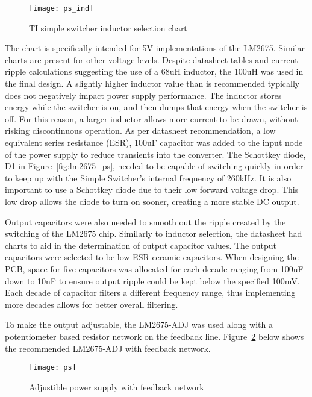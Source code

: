 \begin{figure}[H]
    \centering
    \texttt{[image: ps\_ind]}
    \caption{TI simple switcher inductor selection chart~\cite{lm2675}}
    \label{fig:inductor}
\end{figure}

The chart is specifically intended for 5V implementations of the LM2675. Similar charts are present for other voltage levels. Despite datasheet tables and current ripple calculations suggesting the use of a 68uH inductor, the 100uH was used in the final design. A slightly higher inductor value than is recommended typically does not negatively impact power supply performance. The inductor stores energy while the switcher is on, and then dumps that energy when the switcher is off. For this reason, a larger inductor allows more current to be drawn, without risking discontinuous operation. As per datasheet recommendation, a low equivalent series resistance (ESR), 100uF capacitor was added to the input node of the power supply to reduce transients into the converter. The Schottkey diode, D1 in Figure~\ref{fig:lm2675_ps}, needed to be capable of switching quickly in order to keep up with the Simple Switcher's internal frequency of 260kHz. It is also important to use a Schottkey diode due to their low forward voltage drop. This low drop allows the diode to turn on sooner, creating a more stable DC output.

Output capacitors were also needed to smooth out the ripple created by the switching of the LM2675 chip. Similarly to inductor selection, the datasheet had charts to aid in the determination of output capacitor values. The output capacitors were selected to be low ESR ceramic capacitors. When designing the PCB, space for five capacitors was allocated for each decade ranging from 100uF down to 10nF to ensure output ripple could be kept below the specified 100mV. Each decade of capacitor filters a different frequency range, thus implementing more decades allows for better overall filtering.

To make the output adjustable, the LM2675-ADJ was used along with a potentiometer based resistor network on the feedback line. Figure~\ref{fig:feedback} below shows the recommended LM2675-ADJ with feedback network.

\begin{figure}[H]
    \centering
    \texttt{[image: ps]}
    \caption{Adjustible power supply with feedback network}
    \label{fig:feedback}
\end{figure}


